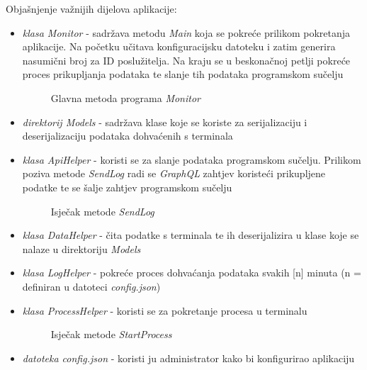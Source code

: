 \documentclass[zavrsnirad]{fer}
\begin{document}
Objašnjenje važnijih dijelova aplikacije:
\begin{itemize}
	\item \textit{klasa Monitor} - sadržava metodu \textit{Main} koja se pokreće prilikom pokretanja aplikacije. Na početku učitava konfiguracijsku datoteku i zatim generira nasumični broj za ID poslužitelja. Na kraju se u beskonačnoj petlji pokreće proces prikupljanja podataka te slanje tih podataka programskom sučelju
	\begin{figure}[htb]
		\centering
		
		\caption{Glavna metoda programa \textit{Monitor}}
	\end{figure}
	\FloatBarrier	
	\item \textit{direktorij Models} - sadržava klase koje se koriste za serijalizaciju i deserijalizaciju podataka dohvaćenih s terminala
	\item \textit{klasa ApiHelper} - koristi se za slanje podataka programskom sučelju. Prilikom poziva metode \textit{SendLog} radi se \textit{GraphQL} zahtjev koristeći prikupljene podatke te se šalje zahtjev programskom sučelju
	\begin{figure}[htb]
		\centering
		
		\caption{Isječak metode \textit{SendLog}}
	\end{figure}
	\FloatBarrier		
	\item \textit{klasa DataHelper} - čita podatke s terminala te ih deserijalizira u klase koje se nalaze u direktoriju \textit{Models}
	\item \textit{klasa LogHelper} - pokreće proces dohvaćanja podataka svakih [n] minuta (n = definiran u datoteci \textit{config.json})
	\item \textit{klasa ProcessHelper} - koristi se za pokretanje procesa u terminalu
	\begin{figure}[htb]
		\centering
		
		\caption{Isječak metode \textit{StartProcess}}
	\end{figure}	
	\item \textit{datoteka config.json} - koristi ju administrator kako bi konfigurirao aplikaciju
\end{itemize}
\end{document}
